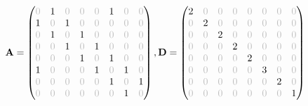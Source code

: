$ \mathbf{A}=
    \begin{pmatrix}
    \color{lightgray} 0 & 1 & \color{lightgray} 0 & \color{lightgray} 0 & \color{lightgray} 0 & 1 & \color{lightgray} 0 & \color{lightgray} 0 \\
    1 & \color{lightgray} 0 & 1 & \color{lightgray} 0 & \color{lightgray} 0 & \color{lightgray} 0 & \color{lightgray} 0 & \color{lightgray} 0 \\
    \color{lightgray} 0 & 1 & \color{lightgray} 0 & 1 & \color{lightgray} 0 & \color{lightgray} 0 & \color{lightgray} 0 & \color{lightgray} 0 \\
    \color{lightgray} 0 & \color{lightgray} 0 & 1 & \color{lightgray} 0 & 1 & \color{lightgray} 0 & \color{lightgray} 0 & \color{lightgray} 0 \\
    \color{lightgray} 0 & \color{lightgray} 0 & \color{lightgray} 0 & 1 & \color{lightgray} 0 & 1 & \color{lightgray} 0 & \color{lightgray} 0 \\
    1 & \color{lightgray} 0 & \color{lightgray} 0 & \color{lightgray} 0 & 1 & \color{lightgray} 0 & 1 & \color{lightgray} 0 \\
    \color{lightgray} 0 & \color{lightgray} 0 & \color{lightgray} 0 & \color{lightgray} 0 & \color{lightgray} 0 & 1 & \color{lightgray} 0 & 1 \\
    \color{lightgray} 0 & \color{lightgray} 0 & \color{lightgray} 0 & \color{lightgray} 0 & \color{lightgray} 0 & \color{lightgray} 0 & 1 & \color{lightgray} 0 
    \end{pmatrix},
    \mathbf{D}=
    \begin{pmatrix}
    2 & \color{lightgray} 0 & \color{lightgray} 0 & \color{lightgray} 0 & \color{lightgray} 0 & \color{lightgray} 0 & \color{lightgray} 0 & \color{lightgray} 0 \\
    \color{lightgray} 0 & 2 & \color{lightgray} 0 & \color{lightgray} 0 & \color{lightgray} 0 & \color{lightgray} 0 & \color{lightgray} 0 & \color{lightgray} 0 \\
    \color{lightgray} 0 & \color{lightgray} 0 & 2 & \color{lightgray} 0 & \color{lightgray} 0 & \color{lightgray} 0 & \color{lightgray} 0 & \color{lightgray} 0 \\
    \color{lightgray} 0 & \color{lightgray} 0 & \color{lightgray} 0 & 2 & \color{lightgray} 0 & \color{lightgray} 0 & \color{lightgray} 0 & \color{lightgray} 0 \\
    \color{lightgray} 0 & \color{lightgray} 0 & \color{lightgray} 0 & \color{lightgray} 0 & 2 & \color{lightgray} 0 & \color{lightgray} 0 & \color{lightgray} 0 \\
    \color{lightgray} 0 & \color{lightgray} 0 & \color{lightgray} 0 & \color{lightgray} 0 & \color{lightgray} 0 & 3 & \color{lightgray} 0 & \color{lightgray} 0 \\
    \color{lightgray} 0 & \color{lightgray} 0 & \color{lightgray} 0 & \color{lightgray} 0 & \color{lightgray} 0 & \color{lightgray} 0 & 2 & \color{lightgray} 0 \\
    \color{lightgray} 0 & \color{lightgray} 0 & \color{lightgray} 0 & \color{lightgray} 0 & \color{lightgray} 0 & \color{lightgray} 0 & \color{lightgray} 0 & 1 
    \end{pmatrix}
    $